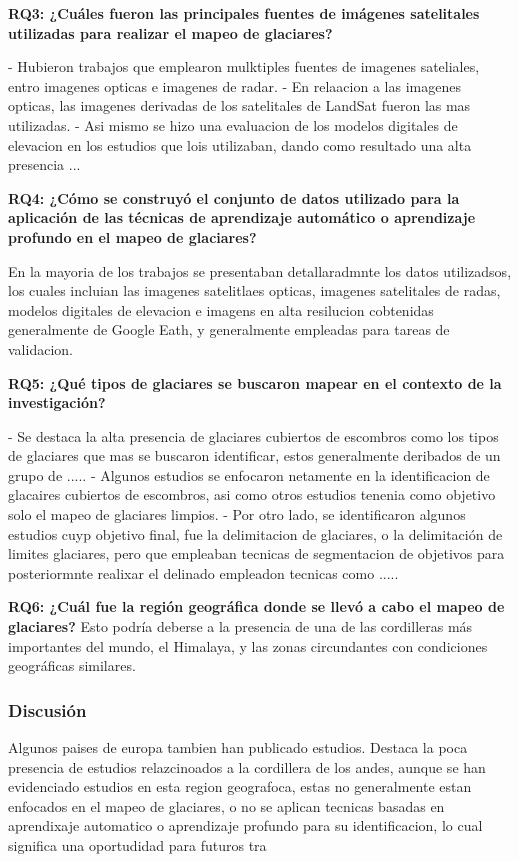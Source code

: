 \textbf{RQ3: ¿Cuáles fueron las principales fuentes de imágenes satelitales utilizadas para realizar el mapeo de glaciares?}

- Hubieron trabajos que emplearon mulktiples fuentes de imagenes sateliales, entro imagenes opticas e imagenes de radar.
- En relaacion a las imagenes opticas, las imagenes derivadas de los satelitales de LandSat fueron las mas utilizadas.
- Asi mismo se hizo una evaluacion de los modelos digitales de elevacion en los estudios que lois utilizaban, dando como resultado una alta presencia ...

\textbf{RQ4: ¿Cómo se construyó el conjunto de datos utilizado para la aplicación de las técnicas de aprendizaje automático o aprendizaje profundo en el mapeo de glaciares?}

En la mayoria de los trabajos se presentaban detallaradmnte los datos utilizadsos, los cuales incluian las imagenes satelitlaes opticas, imagenes satelitales de radas, modelos digitales de elevacion e imagens en alta resilucion cobtenidas generalmente de Google Eath, y generalmente empleadas para tareas de validacion.


\textbf{RQ5: ¿Qué tipos de glaciares se buscaron mapear en el contexto de la investigación?}

- Se destaca la alta presencia de glaciares cubiertos de escombros como los tipos de glaciares que mas se buscaron identificar, estos generalmente deribados de un grupo de .....
- Algunos estudios se enfocaron netamente en la identificacion de glacaires cubiertos de escombros, asi como otros estudios tenenia como objetivo solo el mapeo de glaciares limpios.
- Por otro lado, se identificaron algunos estudios cuyp objetivo final, fue la delimitacion de glaciares, o la delimitación de limites glaciares, pero que empleaban tecnicas de segmentacion de objetivos para posteriormnte realixar el delinado empleadon tecnicas como .....
 
\textbf{RQ6: ¿Cuál fue la región geográfica donde se llevó a cabo el mapeo de glaciares?}
Esto podría deberse a la presencia de una de las cordilleras más importantes del mundo, el Himalaya, y las zonas circundantes con condiciones geográficas similares.

\subsubsection{Discusión}

Algunos paises de europa tambien han publicado estudios. Destaca la poca presencia de estudios relazcinoados a la cordillera de los andes, aunque se han evidenciado estudios en esta region geografoca, estas no generalmente estan enfocados en el mapeo de glaciares, o no se aplican tecnicas basadas en aprendixaje automatico o aprendizaje profundo para su identificacion, lo cual significa una oportudidad para futuros tra

